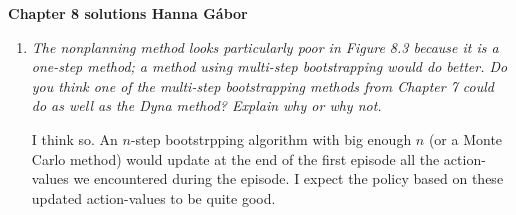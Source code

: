 \documentclass[12pt,a4paper]{article}
\begin{document}
\textbf{Chapter 8 solutions  \hfill Hanna Gábor}

\begin{enumerate}
  \item
    \textit{The nonplanning method looks particularly poor in Figure 8.3 because it is
    a one-step method; a method using multi-step bootstrapping would do better. Do you
    think one of the multi-step bootstrapping methods from Chapter 7 could do as well as
    the Dyna method? Explain why or why not.}

    I think so. An $n$-step bootstrpping algorithm with big enough $n$ (or a Monte Carlo
    method) would update at the end of the first episode all the action-values we encountered
    during the episode.
    I expect the policy based on these updated action-values to be quite good.

\end{enumerate}
\end{document}
